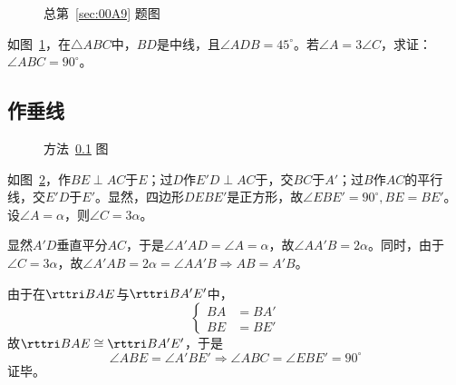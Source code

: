 

\begin{figure}[htbp]
  \centering {}
  \caption{总第~\ref{sec:00A9} 题图} \label{fig:00A9}
\end{figure}

如图~\ref{fig:00A9}，在$\triangle ABC$中，$BD$是中线，且$\angle ADB = 45^\circ$。若$\angle A = 3\angle C$，求证：$\angle ABC = 90^\circ$。

\subsection{作垂线} \label{subsec:00A9-h}

\begin{figure}[htbp]
  \centering {}
  \caption{方法~\ref{subsec:00A9-h} 图} \label{fig:00A9-h}
\end{figure}

如图~\ref{fig:00A9-h}，作$BE \perp AC$于$E$；过$D$作$E'D \perp AC$于，交$BC$于$A'$；过$B$作$AC$的平行线，交$E'D$于$E'$。显然，四边形$DEBE'$是正方形，故$\angle EBE' = 90^\circ, BE = BE'$。设$\angle A = \alpha$，则$\angle C = 3\alpha$。

显然$A'D$垂直平分$AC$，于是$\angle A'AD = \angle A = \alpha$，故$\angle AA'B = 2\alpha$。同时，由于$\angle C = 3\alpha$，故$\angle A'AB = 2\alpha = \angle AA'B \Rightarrow AB = A'B$。

由于在$\rttri BAE$与$\rttri BA'E'$中，
\[ \left\{\begin{aligned}
  BA &= BA' \\ BE &= BE'
\end{aligned}\right. \]
故$\rttri BAE \cong \rttri BA'E'$，于是
\[ \angle ABE = \angle A'BE' \Rightarrow \angle ABC = \angle EBE' = 90^\circ \]
证毕。
